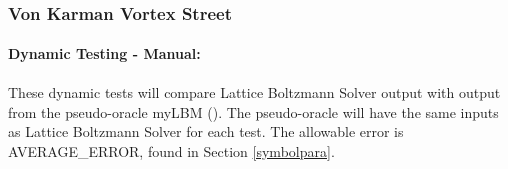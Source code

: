 \documentclass[12pt, titlepage]{article}
\newcommand{\famname}{Lattice Boltzmann Solver}
\begin{document}
~\newpage

\subsubsection{Von Karman Vortex Street}
\label{frvkvs}
		
\paragraph{Dynamic Testing - Manual:}
\paragraph{} These dynamic tests will compare {\famname} output with output from
the pseudo-oracle myLBM (\citet{pylbmcode}). The pseudo-oracle will have the
same inputs as {\famname} for each test. The allowable error is AVERAGE\_ERROR,
found in Section \ref{symbolpara}. 
\end{document}
